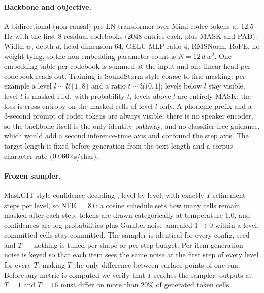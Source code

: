 \documentclass{article}
\newcommand{\dc}[1]{\textcolor{dcol}{#1}}
\newcommand{\wc}[1]{\textcolor{wcol}{#1}}
\newcommand{\tc}[1]{\textcolor{tcol}{#1}}
\begin{document}
\paragraph{Backbone and objective.}
A bidirectional (non-causal) pre-LN transformer over Mimi \citep{moshi} codec tokens at 12.5\,Hz with the
first 8 residual codebooks (2048 entries each, plus MASK and PAD). \wc{Width $w$}, \dc{depth $d$}, head dimension 64, GELU MLP ratio 4, RMSNorm, RoPE, no weight tying, so the non-embedding
parameter count is $N = 12\,d\,w^{2}$. One embedding table per codebook is summed at the
input and one linear head per codebook reads out. Training is SoundStorm-style \citep{soundstorm}
coarse-to-fine masking: per example a level $l \sim \mathcal{U}\{1..8\}$ and a ratio
$t \sim \mathcal{U}(0,1]$; levels below $l$ stay visible, level $l$ is masked i.i.d.\ with
probability $t$, levels above $l$ are entirely MASK; the loss is cross-entropy on the masked
cells of level $l$ only. A phoneme prefix and a 3-second prompt of codec tokens are always
visible; there is no speaker encoder, so the backbone itself is the only identity pathway,
and no classifier-free guidance, which would add a second inference-time axis and confound
the step axis. The target length is fixed before generation from the text length and a
corpus character rate ($0.0602$\,s/char).

\paragraph{Frozen sampler.}
MaskGIT-style confidence decoding \citep{maskgit}, level by level, with exactly \tc{$T$ refinement steps per level}, so NFE $= 8T$: a cosine schedule sets how many cells remain masked after each step, tokens are
drawn categorically at temperature 1.0, and confidences are log-probabilities plus Gumbel
noise annealed $1 \to 0$ within a level; committed cells stay committed. The sampler is
identical for every config, seed and $T$ --- nothing is tuned per shape or per step budget.
Per-item generation noise is keyed so that each item sees the same noise at the first step of
every level for every $T$, making $T$ the only difference between surface points of one run.
Before any metric is computed we verify that $T$ reaches the sampler: outputs at $T{=}1$ and
$T{=}16$ must differ on more than 20\% of generated token cells.
\end{document}
